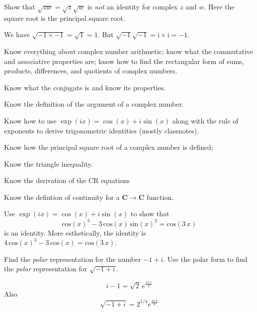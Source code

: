\documentclass[fleqn,12pt]{exam}
\newcommand{\complex}{\mathbf{C}}
\newcommand{\imag}{\mathrm{i}}
\begin{document}
\begin{questions}



\question  Show that \(\sqrt{z w} = \sqrt{z} \sqrt{w} \) is \emph{not} an identity for complex \(z\) and \(w\). 
Here the square root is the principal square root.

\begin{solution}
We have \(\sqrt{-1 \times -1} = \sqrt{1} = 1\). But \(\sqrt{-1} \sqrt{-1} = \imag \times \imag = -1\).

\end{solution}










\question Know everything about complex number arithmetic; know what the commutative and associative
properties are; know how to find the rectangular form of sums, products, differences, and quotients
of complex numbers.
 
\question Know what the conjugate is and know its properties.


\question Know the definition of the argument of a complex number.

\question Know how to use \(\exp(i x) = \cos(x) + i \sin(x)\) along with the rule of
exponents to derive trigonometric identities (mostly classnotes).

\question Know how the principal square root of a complex number is
defined;

\question Know the triangle inequality.


\question Know the derivation of the CR equations

\question Know the defintion of continuity  for a \(\complex \to \complex\) function.











\question  Use \(\exp(i x)  = \cos(x) + i \sin(x)\) to show that
\[
 {\mathrm{cos}\left( x\right) }^{3}-3\,\mathrm{cos}\left( x\right) \,{\mathrm{sin}\left( x\right) }^{2}=\mathrm{cos}\left( 3\,x\right) 
\]
is an identity. More esthetically, the identity is \(4\,{\mathrm{cos}\left( x\right) }^{3}-3\,\mathrm{cos}\left( x\right) =\mathrm{cos}\left( 3\,x\right) \).




\question  Find the \emph{polar} representation for the number \(-1 + i\). Use the 
polar form to find the \emph{polar} representation for \(\sqrt{-1+i}\).
\begin{solution}%
\[i-1=\sqrt{2}\,{e}^{\frac{3\,i\,\pi }{4}}\]
Also
\[\sqrt{-1+i} = 2^{1/4} {e}^{\frac{3\,i\,\pi }{8}}\]
\end{solution}




\end{questions}
\end{document}
